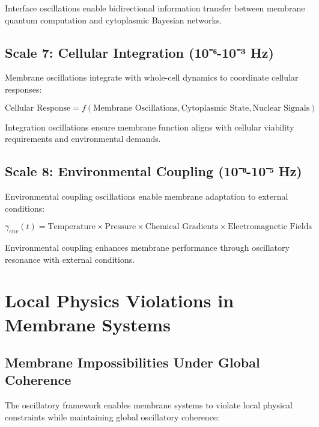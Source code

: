 \documentclass[12pt,a4paper]{article}
\begin{document}
Interface oscillations enable bidirectional information transfer between membrane quantum computation and cytoplasmic Bayesian networks.

\subsection{Scale 7: Cellular Integration (10⁻⁶-10⁻³ Hz)}

Membrane oscillations integrate with whole-cell dynamics to coordinate cellular responses:

\begin{equation}
\text{Cellular Response} = f(\text{Membrane Oscillations}, \text{Cytoplasmic State}, \text{Nuclear Signals})
\end{equation}

Integration oscillations ensure membrane function aligns with cellular viability requirements and environmental demands.

\subsection{Scale 8: Environmental Coupling (10⁻⁸-10⁻⁵ Hz)}

Environmental coupling oscillations enable membrane adaptation to external conditions:

\begin{equation}
\gamma_{env}(t) = \text{Temperature} \times \text{Pressure} \times \text{Chemical Gradients} \times \text{Electromagnetic Fields}
\end{equation}

Environmental coupling enhances membrane performance through oscillatory resonance with external conditions.

\section{Local Physics Violations in Membrane Systems}

\subsection{Membrane Impossibilities Under Global Coherence}

The oscillatory framework enables membrane systems to violate local physical constraints while maintaining global oscillatory coherence:
\end{document}
